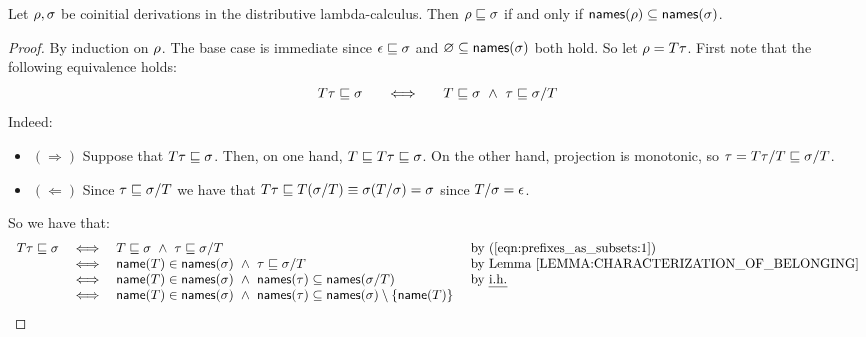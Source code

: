 \begin{proposition}
Let $\rho,\sigma$ be coinitial derivations in the distributive lambda-calculus.
Then
$\rho \sqsubseteq \sigma$ if and only if $\mathsf{names}(\rho) \subseteq \mathsf{names}(\sigma)$.
\end{proposition}
\begin{proof}
By induction on $\rho$.
The base case is immediate since $\epsilon \sqsubseteq \sigma$
and $\varnothing \subseteq \mathsf{names}(\sigma)$ both hold.
So let $\rho = T\tau$. First note that
the following equivalence holds:
\begin{equation}
\leqn{prefixes_as_subsets:1}
    \redexthree\redseqthree \permle \redseqtwo
    \HS\iff\HS
    \redexthree \permle \redseqtwo \ \land\ \redseqthree \permle \redseqtwo/\redexthree
\end{equation}
Indeed:
\begin{itemize}
\item $(\Rightarrow)$
    Suppose that $T\tau \sqsubseteq \sigma$.
    Then, on one hand, $T \sqsubseteq T\tau \sqsubseteq \sigma$.
    On the other hand, projection is monotonic, so
    $\tau = T\tau/T \sqsubseteq \sigma/T$.
\item $(\Leftarrow)$
    Since $\tau \sqsubseteq \sigma/T$
    we have that $T\tau \sqsubseteq T(\sigma/T) \equiv \sigma(T/\sigma) = \sigma$
    since $T/\sigma = \epsilon$.
\end{itemize}
So we have that:
\[
  \begin{array}{rcll}
    \redexthree\redseqthree \permle \redseqtwo
    & \iff &
    \redexthree \permle \redseqtwo \ \land\ \redseqthree \permle \redseqtwo/\redexthree
      & \text{ by \reqn{prefixes_as_subsets:1}} \\
    & \iff &
    \name(\redexthree) \in \names(\redseqtwo) \ \land\ \redseqthree \permle \redseqtwo/\redexthree
      & \text{ by \rlem{characterization_of_belonging}} \\
    & \iff &
    \name(\redexthree) \in \names(\redseqtwo) \ \land\ \names(\redseqthree) \subseteq \names(\redseqtwo/\redexthree)
      & \text{ by \ih} \\
    & \iff &
    \name(\redexthree) \in \names(\redseqtwo) \ \land\ \names(\redseqthree) \subseteq \names(\redseqtwo) \setminus \set{\name(\redexthree)}

\end{array}\]
\end{proof}

